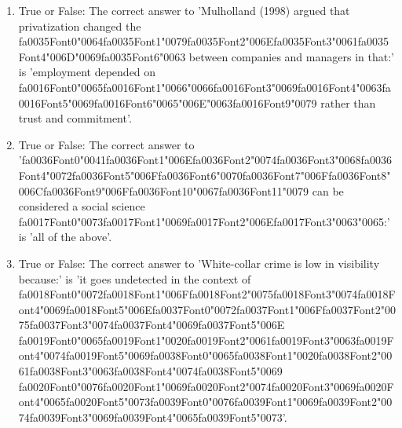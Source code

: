 \documentclass[12pt]{article}
\begin{document}
\begin{enumerate}[label=\arabic*.]
\item True or False: The correct answer to 'Mulholland (1998) argued that privatization changed the {\csname fa0035Font0\endcsname\char"0064}{\csname fa0035Font1\endcsname\char"0079}{\csname fa0035Font2\endcsname\char"006E}{\csname fa0035Font3\endcsname\char"0061}{\csname fa0035Font4\endcsname\char"006D}{\char"0069}{\csname fa0035Font6\endcsname\char"0063} between companies and managers in that:' is 'employment depended on {\csname fa0016Font0\endcsname\char"0065}{\csname fa0016Font1\endcsname\char"0066}{\char"0066}{\csname fa0016Font3\endcsname\char"0069}{\csname fa0016Font4\endcsname\char"0063}{\csname fa0016Font5\endcsname\char"0069}{\csname fa0016Font6\endcsname\char"0065}{\char"006E}{\char"0063}{\csname fa0016Font9\endcsname\char"0079} rather than trust and commitment'.
\item True or False: The correct answer to '{\csname fa0036Font0\endcsname\char"0041}{\csname fa0036Font1\endcsname\char"006E}{\csname fa0036Font2\endcsname\char"0074}{\csname fa0036Font3\endcsname\char"0068}{\csname fa0036Font4\endcsname\char"0072}{\csname fa0036Font5\endcsname\char"006F}{\csname fa0036Font6\endcsname\char"0070}{\csname fa0036Font7\endcsname\char"006F}{\csname fa0036Font8\endcsname\char"006C}{\csname fa0036Font9\endcsname\char"006F}{\csname fa0036Font10\endcsname\char"0067}{\csname fa0036Font11\endcsname\char"0079} can be considered a social science {\csname fa0017Font0\endcsname\char"0073}{\csname fa0017Font1\endcsname\char"0069}{\csname fa0017Font2\endcsname\char"006E}{\csname fa0017Font3\endcsname\char"0063}{\char"0065}:' is 'all of the above'.
\item True or False: The correct answer to 'White-collar crime is low in visibility because:' is 'it goes undetected in the context of {\csname fa0018Font0\endcsname\char"0072}{\csname fa0018Font1\endcsname\char"006F}{\csname fa0018Font2\endcsname\char"0075}{\csname fa0018Font3\endcsname\char"0074}{\csname fa0018Font4\endcsname\char"0069}{\csname fa0018Font5\endcsname\char"006E}{\csname fa0037Font0\endcsname\char"0072}{\csname fa0037Font1\endcsname\char"006F}{\csname fa0037Font2\endcsname\char"0075}{\csname fa0037Font3\endcsname\char"0074}{\csname fa0037Font4\endcsname\char"0069}{\csname fa0037Font5\endcsname\char"006E} {\csname fa0019Font0\endcsname\char"0065}{\csname fa0019Font1\endcsname\char"0020}{\csname fa0019Font2\endcsname\char"0061}{\csname fa0019Font3\endcsname\char"0063}{\csname fa0019Font4\endcsname\char"0074}{\csname fa0019Font5\endcsname\char"0069}{\csname fa0038Font0\endcsname\char"0065}{\csname fa0038Font1\endcsname\char"0020}{\csname fa0038Font2\endcsname\char"0061}{\csname fa0038Font3\endcsname\char"0063}{\csname fa0038Font4\endcsname\char"0074}{\csname fa0038Font5\endcsname\char"0069} {\csname fa0020Font0\endcsname\char"0076}{\csname fa0020Font1\endcsname\char"0069}{\csname fa0020Font2\endcsname\char"0074}{\csname fa0020Font3\endcsname\char"0069}{\csname fa0020Font4\endcsname\char"0065}{\csname fa0020Font5\endcsname\char"0073}{\csname fa0039Font0\endcsname\char"0076}{\csname fa0039Font1\endcsname\char"0069}{\csname fa0039Font2\endcsname\char"0074}{\csname fa0039Font3\endcsname\char"0069}{\csname fa0039Font4\endcsname\char"0065}{\csname fa0039Font5\endcsname\char"0073}'.

\end{enumerate}
\end{document}
